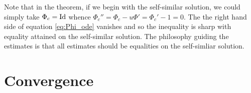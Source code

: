 \documentclass[12pt]{amsart}
\begin{document}
\begin{remark}
 Note that in the theorem, if we begin with the self-similar solution, we could simply take $\Phi_c = \operatorname{Id}$ whence $\Phi_c'' = \Phi_c - u \Phi' = \Phi_c' - 1 = 0$. The the right hand side of equation \eqref{eq:Phi_ode} vanishes and so the inequality is sharp with equality attained on the self-similar solution. The philosophy guiding the estimates is that all estimates should be equalities on the self-simliar solution.
\end{remark}

\section{Convergence}
\label{sec:orgheadline12}
\end{document}
